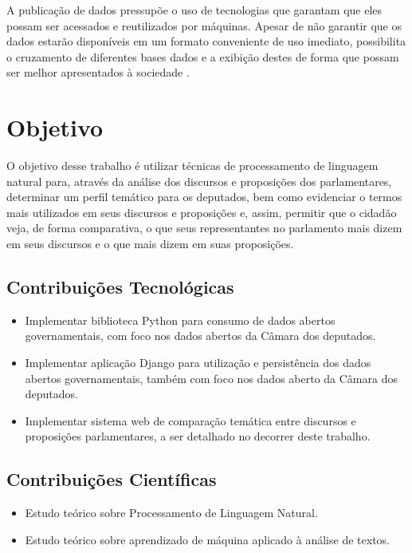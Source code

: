 A publicação de dados pressupõe o uso de tecnologias que garantam que eles possam ser acessados e reutilizados por máquinas. Apesar de não garantir que os dados estarão disponíveis em um formato conveniente de uso imediato, possibilita o cruzamento de diferentes bases dados e a exibição destes de forma que possam ser melhor apresentados à sociedade \cite{diniz2010}.

\section{Objetivo}
\label{sec:objetivo}

O objetivo desse trabalho é utilizar técnicas de processamento de linguagem natural para, através da análise dos discursos e proposições dos parlamentares, determinar um perfil temático para os deputados, bem como evidenciar o termos mais utilizados em seus discursos e proposições e, assim, permitir que o cidadão veja, de forma comparativa, o que seus representantes no parlamento mais dizem em seus discursos e o que mais dizem em suas proposições.

\subsection{Contribuições Tecnológicas}
\label{sub:contribuicoes_tecnologicas}

\begin{itemize}
    \item Implementar biblioteca Python para consumo de dados abertos governamentais, com foco nos dados abertos da Câmara dos deputados.
    \item Implementar aplicação Django para utilização e persistência dos dados abertos governamentais, também com foco nos dados aberto da Câmara dos deputados.
    \item Implementar sistema web de comparação temática entre discursos e proposições parlamentares, a ser detalhado no decorrer deste trabalho.
\end{itemize}

\subsection{Contribuições Científicas}
\label{sub:contribuições_científicas}

\begin{itemize}
    \item Estudo teórico sobre Processamento de Linguagem Natural.
    \item Estudo teórico sobre aprendizado de máquina aplicado à análise de textos.
\end{itemize}

